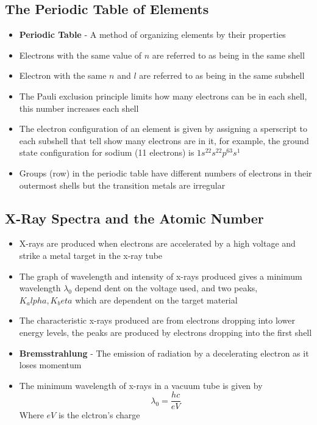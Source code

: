 \subsection{The Periodic Table of Elements}
\begin{itemize}
    \item \textbf{Periodic Table} - A method of organizing elements by their properties
    \item Electrons with the same value of \(n\) are referred to as being in the same shell
    \item Electron with the same \(n\) and \(l\) are referred to as being in the same subshell
    \item The Pauli exclusion principle limits how many electrons can be in each shell, this number increases each shell
    \item The electron configuration of an element is given by assigning a sperscript to each subshell that tell show many electrons are in it, for example, the ground state configuration for sodium (11 electrons) is \(1s^22s^22p^63s^1\)
    \item Groups (row) in the periodic table have different numbers of electrons in their outermost shells but the transition metals are irregular 
\end{itemize}

\subsection{X-Ray Spectra and the Atomic Number}
\begin{itemize}
    \item X-rays are produced when electrons are accelerated by a high voltage and strike a metal target in the x-ray tube
    \item The graph of wavelength and intensity of x-rays produced gives a minimum wavelength \(\lambda_0\) depend dent on the voltage used, and two peaks, \(K_alpha, K_beta\) which are dependent on the target material
    \item The characteristic x-rays produced are from electrons dropping into lower energy levels, the peaks are produced by electrons dropping into the first shell
    \item \textbf{Bremsstrahlung} - The emission of radiation by a decelerating electron as it loses momentum
    \item The minimum wavelength of x-rays in a vacuum tube is given by \[\lambda_0=\frac{hc}{eV}\] Where \(eV\) is the elctron's charge
\end{itemize}

